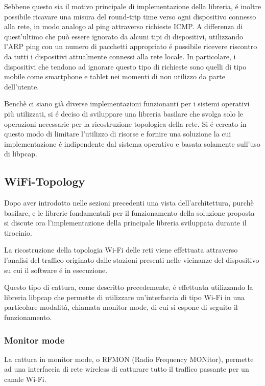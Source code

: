 Sebbene questo sia il motivo principale di implementazione della libreria, \'e inoltre possibile ricavare una misura del round-trip time verso ogni dispositivo connesso alla rete, in modo analogo al ping attraverso richieste ICMP.
A differenza di quest'ultimo che pu\`o essere ignorato da alcuni tipi di dispositivi, utilizzando l'ARP ping con un numero di pacchetti appropriato \'e possibile ricevere riscontro da tutti i dispositivi attualmente connessi alla rete locale.
In particolare, i dispositivi che tendono ad ignorare questo tipo di richieste sono quelli di tipo mobile come smartphone e tablet nei momenti di non utilizzo da parte dell'utente.

Bench\`e ci siano gi\`a diverse implementazioni funzionanti per i sistemi operativi pi\`u utilizzati, si \'e deciso di sviluppare una libreria basilare che svolga solo le operazioni necessarie per la ricostruzione topologica della rete.
Si \'e cercato  in questo modo di limitare l'utilizzo di risorse e fornire una soluzione la cui implementazione \'e indipendente dal sistema operativo e basata solamente sull'uso di libpcap.

\newpage



\subsection{WiFi-Topology}
Dopo aver introdotto nelle sezioni precedenti una vista dell'architettura, purch\`e basilare, e le librerie fondamentali per il funzionamento della soluzione proposta si discute ora l'implementazione della principale libreria sviluppata durante il tirocinio.

La ricostruzione della topologia Wi-Fi delle reti viene effettuata attraverso l'analisi del traffico originato dalle stazioni presenti nelle vicinanze del dispositivo su cui il software \'e in esecuzione.

Questo tipo di cattura, come descritto precedemente, \'e effettuata utilizzando la libreria libpcap che permette di utilizzare un'interfaccia di tipo Wi-Fi in una particolare modalit\`a, chiamata monitor mode, di cui si espone di seguito il funzionamento.

\subsubsection{Monitor mode}
La cattura in monitor mode, o RFMON (Radio Frequency MONitor), permette ad una interfaccia di rete wireless di catturare tutto il traffico passante per un canale Wi-Fi.

